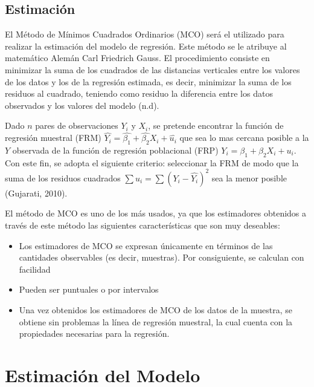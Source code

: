 \documentclass[11pt]{article}
\begin{document}
{ 
 \subsection{Estimación}
El Método de Mínimos Cuadrados Ordinarios (MCO) será el utilizado para realizar la estimación del modelo de regresión. Este método se le atribuye al matemático Alemán Carl Friedrich Gauss. El procedimiento consiste en minimizar
la suma de los cuadrados de las distancias verticales entre los valores de los datos y los de la regresión estimada, es decir, minimizar la suma de los residuos al cuadrado, teniendo como residuo la diferencia entre los datos observados y los valores del modelo (n.d).

Dado $n$ pares de observaciones $Y_i$ y $X_i$, se pretende encontrar la función de regresión muestral (FRM)  $\hat{Y_i} = \hat{\beta_1} + \hat{\beta_2} X_i + \hat{u_i}$ que sea lo mas cercana posible a la $Y$ observada de la función de regresión poblacional (FRP) $Y_i = \beta_1 + \beta_2 X_i + u_i$. Con este fin, se adopta el siguiente criterio: seleccionar la FRM de modo que la suma de los residuos cuadrados $\sum u_i = \sum ( Y_i - \hat{Y_i})^2 $ sea la menor posible (Gujarati, 2010).

El método de MCO es uno de los más usados, ya que los estimadores obtenidos a través de este método las siguientes características que son muy deseables:
\begin{itemize}
    \item  Los estimadores de MCO se expresan únicamente en términos de las cantidades observables (es decir, muestras). Por consiguiente, se calculan con facilidad
    \item Pueden ser puntuales o por intervalos
    \item Una vez obtenidos los estimadores de MCO de los datos de la muestra, se obtiene sin problemas la línea de regresión muestral, la cual cuenta con la propiedades necesarias para la regresión.
\end{itemize}

\section{Estimación del Modelo}

}
\end{document}
